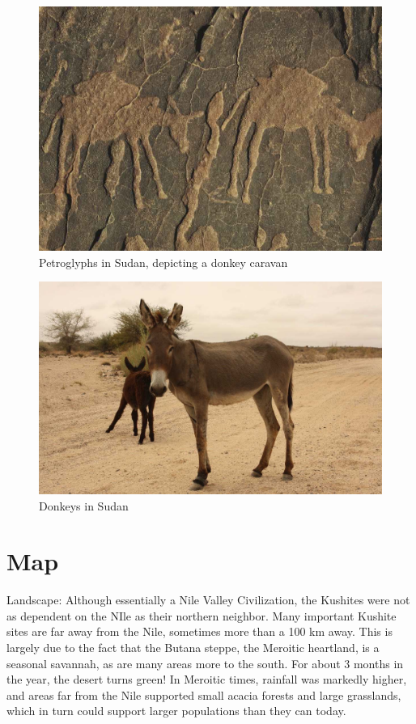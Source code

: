 \documentclass[a4paper,12pt]{scrreprt}
\begin{document}
\begin{figure}[H]
	\centering
	\includegraphics[width=\textwidth]{img/trader_land/petroglyphs_donkey_caravan}
	\caption{Petroglyphs in Sudan, depicting a donkey caravan}
\end{figure}

\begin{figure}[H]
	\centering
	\includegraphics[width=\textwidth]{img/trader_land/donkey_sudan}
	\caption{Donkeys in Sudan}
\end{figure}

\section{Map}

Landscape: Although essentially a Nile Valley Civilization, the Kushites were not as dependent on the NIle as their northern neighbor. Many important Kushite sites are far away from the Nile, sometimes more than a 100 km away. This is largely due to the fact that the Butana steppe, the Meroitic heartland, is a seasonal savannah, as are many areas more to the south. For about 3 months in the year, the desert turns green! In Meroitic times, rainfall was markedly higher, and areas far from the Nile supported small acacia forests and large grasslands, which in turn could support larger populations than they can today.  
\end{document}
